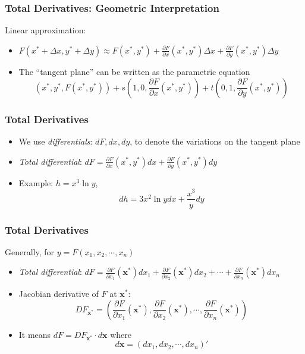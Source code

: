 \documentclass[9pt,aspectratio=169]{beamer}
\begin{document}
\begin{frame}
	\frametitle{Total Derivatives: Geometric Interpretation}
    Linear approximation:
	\begin{itemize}
		\item $F(x^*+\Delta x,y^*+\Delta y)\approx F(x^*,y^*) +
        \frac{\partial F}{\partial x}(x^*,y^*)\Delta x + \frac{\partial
          F}{\partial y}(x^*,y^*)\Delta y$
        \item The ``tangent plane'' can be written as the parametric equation
        \begin{equation*}
            (x^*, y^*, F(x^*, y^*)) + s\left(1, 0, \frac{\partial F}{\partial
                  x}(x^*,y^*)\right) + t\left(0, 1, \frac{\partial
                  F}{\partial y}(x^*,y^*)\right)
        \end{equation*}
	\end{itemize}
\end{frame}		


\begin{frame}
	\frametitle{Total Derivatives}
	\begin{itemize}
		\item We use \emph{differentials}: $dF, dx, dy$, to denote the variations on the tangent plane
		\item \emph{Total differential}: $dF = \frac{\partial F}{\partial x}(x^*,y^*)dx+\frac{\partial F}{\partial y}(x^*,y^*)dy$  
		\item Example: $h = x^3\ln y$, $$dh = 3x^2\ln ydx+\frac{x^3}{y}dy$$
	\end{itemize}
\end{frame}		

\begin{frame}
	\frametitle{Total Derivatives}
	Generally, for $y = F(x_1,x_2,\cdots,x_n)$
	\begin{itemize}
		\item \emph{Total differential}: $dF = \frac{\partial F}{\partial x_1}(\mathbf{x^*})dx_1+\frac{\partial F}{\partial x_2}(\mathbf{x^*})dx_2+\cdots+\frac{\partial F}{\partial x_n}(\mathbf{x^*})dx_n$  
		\item Jacobian derivative of $F$ at $\mathbf{x^*}$: $$DF_{\mathbf{x^*}} = \left(\frac{\partial F}{\partial x_1}(\mathbf{x^*}),\frac{\partial F}{\partial x_2}(\mathbf{x^*}),\cdots,\frac{\partial F}{\partial x_n}(\mathbf{x^*})\right)$$  
		\item It means $dF = DF_{\mathbf{x^*}} \cdot d\mathbf{x}$ where $$d\mathbf{x}= (dx_1,dx_2,\cdots,dx_n)'$$
	\end{itemize}
\end{frame}	
\end{document}
